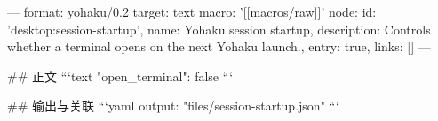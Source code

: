 ---
format: yohaku/0.2
target: text
macro: '[[macros/raw]]'
node: {id: 'desktop:session-startup', name: Yohaku session startup, description: Controls whether a terminal opens on the next Yohaku launch., entry: true, links: []}
---

## 正文
```text
{
  "open_terminal": false
}
```

## 输出与关联
```yaml
output: "files/session-startup.json"
```
